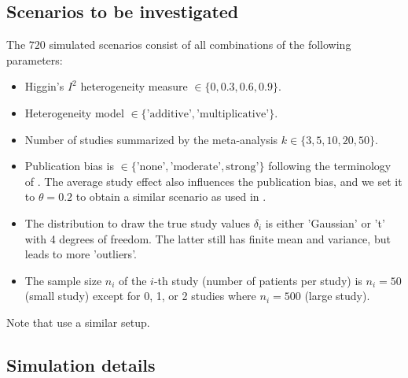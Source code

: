 \documentclass[letterpaper, 9pt]{article}
\begin{document}
\subsection{Scenarios to be investigated} \label{sec:scenario}
The $720$ simulated scenarios consist of all combinations of the following parameters:
\begin{itemize}
\item Higgin's $I^2$ heterogeneity measure $\in \{0, 0.3, 0.6, 0.9\}$.
\item Heterogeneity model $\in \{\text{'additive'}, \text{'multiplicative'}\}$.
\item Number of studies summarized by the meta-analysis $k \in \{3, 5, 10, 20, 50\}$.
\item Publication bias is  $\in \{\text{'none'}, \text{'moderate'}, \text{strong'}\}$ following the terminology of \citet{henm:copa:10}.
  The average study effect also influences the publication bias, and we set it to $\theta = 0.2$ to obtain a similar scenario as used in \citet{henm:copa:10}.
\item The distribution to draw the true study values $\delta_i$ is either 'Gaussian' or 't' with 4 degrees of freedom. The latter still has finite mean and variance, but leads to more 'outliers'.
\item The sample size $n_i$ of the $i$-th study (number of patients per study) is $n_i = 50$ (small study) except for 0, 1, or 2 studies where $n_i=500$ (large study). 
\end{itemize}
Note that \citet{IntHoutIoannidis} use a similar setup.

\subsection{Simulation details}
\end{document}
